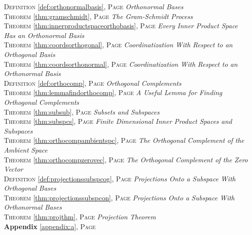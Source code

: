 \begin{multicols}{2}
{\textsc{Definition} \ref{def:orthonormalbasis}, \textsc{Page} \pageref{def:orthonormalbasis} \textit{Orthonormal Bases} \\
\textsc{Theorem} \ref{thm:gramschmidt}, \textsc{Page} \pageref{thm:gramschmidt} \textit{The Gram-Schmidt Process} \\
\textsc{Theorem} \ref{thm:innerproductspaceorthobasis}, \textsc{Page} \pageref{thm:innerproductspaceorthobasis} \textit{Every Inner Product Space Has an Orthonormal Basis} \\
\textsc{Theorem} \ref{thm:coordsorthogonal}, \textsc{Page} \pageref{thm:coordsorthogonal} \textit{Coordinatization With Respect to an Orthogonal Basis} \\
\textsc{Theorem} \ref{thm:coordsorthonormal}, \textsc{Page} \pageref{thm:coordsorthonormal} \textit{Coordinatization With Respect to an Orthonormal Basis} \\
\textsc{Definition} \ref{def:orthocomp}, \textsc{Page} \pageref{def:orthocomp} \textit{Orthogonal Complements} \\
\textsc{Theorem} \ref{thm:lemmafindorthocomp}, \textsc{Page} \pageref{thm:lemmafindorthocomp} \textit{A Useful Lemma for Finding Orthogonal Complements} \\
\textsc{Theorem} \ref{thm:subsub}, \textsc{Page} \pageref{thm:subsub} \textit{Subsets and Subspaces} \\
\textsc{Theorem} \ref{thm:subspcs}, \textsc{Page} \pageref{thm:subspcs} \textit{Finite Dimensional Inner Product Spaces and Subspaces} \\
\textsc{Theorem} \ref{thm:orthocompambientspc}, \textsc{Page} \pageref{thm:orthocompambientspc} \textit{The Orthogonal Complement of the Ambient Space} \\
\textsc{Theorem} \ref{thm:orthocompzerovec}, \textsc{Page} \pageref{thm:orthocompzerovec} \textit{The Orthogonal Complement of the Zero Vector} \\
\textsc{Definition} \ref{def:projectionssubspcog}, \textsc{Page} \pageref{def:projectionssubspcog} \textit{Projections Onto a Subspace With Orthogonal Bases} \\
\textsc{Theorem} \ref{thm:projectionssubspcon}, \textsc{Page} \pageref{thm:projectionssubspcon} \textit{Projections Onto a Subspace With Orthonormal Bases} \\
\textsc{Theorem} \ref{thm:projthm}, \textsc{Page} \pageref{thm:projthm} \textit{Projection Theorem} \\
\textbf{Appendix} \ref{appendix:a}, \textsc{Page} \pageref{appendix:a} \\
}
\end{multicols}

